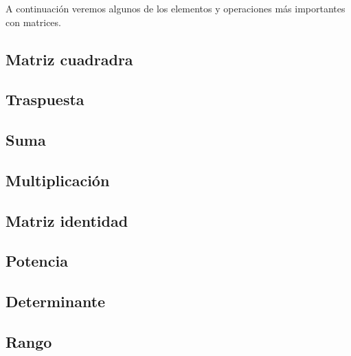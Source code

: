 A continuación veremos algunos de los elementos y operaciones más importantes con matrices.

\subsection{Matriz cuadradra}


\subsection{Traspuesta}


\subsection{Suma}


\subsection{Multiplicación}


\subsection{Matriz identidad}


\subsection{Potencia}


\subsection{Determinante}


\subsection{Rango}

